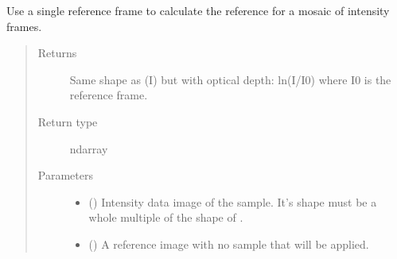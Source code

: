 \documentclass[letterpaper,10pt,english]{sphinxmanual}
\begin{document}
\begin{fulllineitems}
\label{\detokenize{xanespy:xanespy.xanes_math.apply_mosaic_reference}}
Use a single reference frame to calculate the reference for a
mosaic of intensity frames.
\begin{quote}\begin{description}
\item[{Returns}] \leavevmode
{} \textendash{} Same shape as  (I) but with optical depth: ln(I/I0)
where I0 is the reference frame.

\item[{Return type}] \leavevmode
ndarray

\item[{Parameters}] \leavevmode\begin{itemize}
\item {} 
 (\sphinxstyleliteralemphasis{-}) \textendash{} Intensity data image of the sample. It’s shape must be a whole
multiple of the shape of .

\item {} 
 (\sphinxstyleliteralemphasis{-}) \textendash{} A reference image with no sample that will be applied.

\end{itemize}

\end{description}\end{quote}

\end{fulllineitems}

\end{document}
